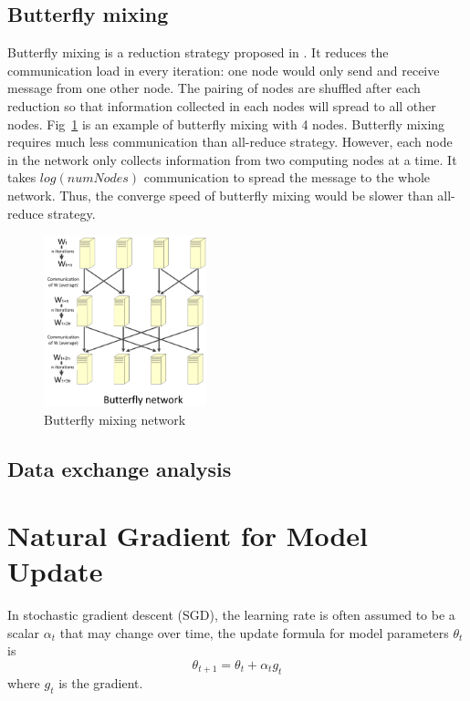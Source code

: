 \documentclass{article}
\begin{document}
\subsection{Butterfly mixing}
Butterfly mixing is a reduction strategy proposed in \cite{zhao2013butterfly}. It reduces the communication load in 
every iteration: one node would only send and receive message from one other node. The pairing of nodes are shuffled after
each reduction so that information collected in each nodes will spread to all other nodes. Fig~\ref{fig:butterfly} 
is an example of butterfly mixing with 4 nodes. Butterfly mixing requires much less communication than all-reduce 
strategy. However, each node in the network only collects information from two computing nodes at a time.
It takes $log(numNodes)$ communication to spread the message to the whole network. Thus, the converge speed 
of butterfly mixing would be slower than all-reduce strategy. 
\begin{figure}[htb]
  \centering
  \includegraphics[width=0.42\textwidth]{butterfly.jpg}
  \caption{Butterfly mixing network}
  \label{fig:butterfly}
\end{figure}

\subsection{Data exchange analysis}

\section{Natural Gradient for Model Update}
In stochastic gradient descent (SGD), the learning rate is often assumed to be a scalar $\alpha_t$ that may change over time,
the update formula for model parameters $\theta_{t}$ is
\begin{equation}
\theta_{t+1} = \theta_{t} + \alpha_t g_t
\end{equation}
where $g_t$ is the gradient.
\end{document}
